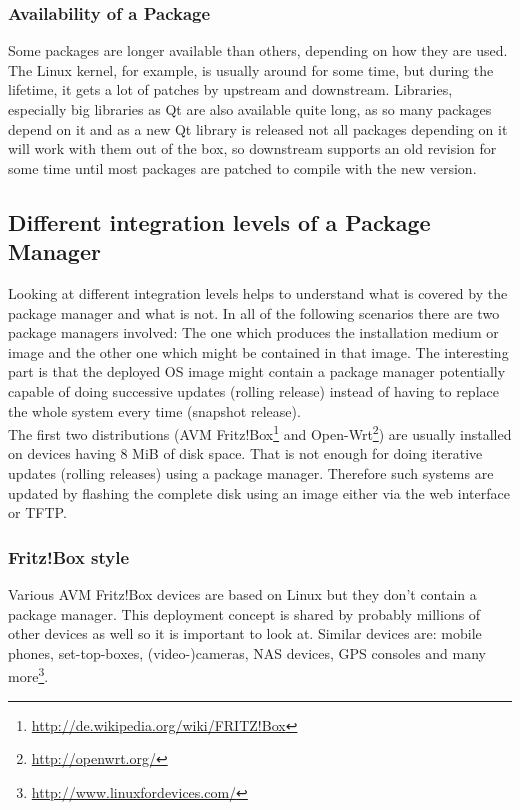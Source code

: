\documentclass[a4paper,10pt]{article}
\begin{document}
\subsubsection*{Availability of a Package}
Some packages are longer available than others, depending on how they are used. The Linux kernel, for example, is usually around for some time, but during the lifetime, it gets a lot of patches by upstream and downstream. Libraries, especially big libraries as Qt are also available quite long, as so many packages depend on it and as a new Qt library is released not all packages depending on it will work with them out of the box, so downstream supports an old revision for some time until most packages are patched to compile with the new version.








\subsection{Different integration levels of a Package Manager}
\label{differentintegrationlevels}
Looking at different integration levels helps to understand what is covered by the package manager and what is not. In all of the following scenarios there are two package managers involved: The one which produces the installation medium or image and the other one which might be contained in that image. The interesting part is that the deployed OS image might contain a package manager potentially capable of doing successive updates (rolling release) instead of having to replace the whole system every time (snapshot release).\\

The first two distributions (AVM Fritz!Box\footnote{\url{http://de.wikipedia.org/wiki/FRITZ!Box}} and Open-Wrt\footnote{\url{http://openwrt.org/}}) are usually installed on devices having 8 MiB of disk space. That is not enough for doing iterative updates (rolling releases) using a package manager. Therefore such systems are updated by flashing the complete disk using an image either via the web interface or TFTP.

\subsubsection{Fritz!Box style}
Various AVM Fritz!Box devices are based on Linux but they don't contain a package manager. This deployment concept is shared by probably millions of other devices as well so it is important to look at. Similar devices are: mobile phones, set-top-boxes, (video-)cameras, NAS devices, GPS consoles and many more\footnote{\url{http://www.linuxfordevices.com/}}.
\end{document}

